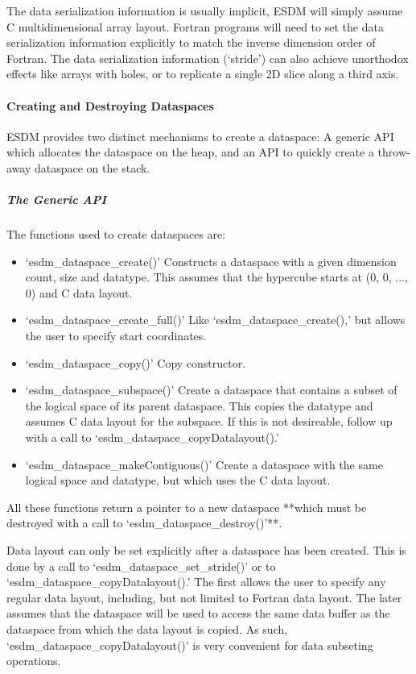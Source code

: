The data serialization information is usually implicit, ESDM will simply
assume C multidimensional array layout. Fortran programs will need to
set the data serialization information explicitly to match the inverse
dimension order of Fortran. The data serialization information
(`stride') can also achieve unorthodox effects like arrays with holes,
or to replicate a single 2D slice along a third axis.

\paragraph{Creating and Destroying Dataspaces}

ESDM provides two distinct mechanisms to create a dataspace: A generic
API which allocates the dataspace on the heap, and an API to quickly
create a throw-away dataspace on the stack.

\subparagraph{The Generic API}

The functions used to create dataspaces are:

\begin{itemize}
  \item `esdm\_dataspace\_create()'
    Constructs a dataspace with a given dimension count, size and
    datatype. This assumes that the hypercube starts at (0, 0, ..., 0) and
    C data layout.
  \item `esdm\_dataspace\_create\_full()'
    Like `esdm\_dataspace\_create(),' but allows the user to specify start
    coordinates.
  \item `esdm\_dataspace\_copy()'
    Copy constructor.
  \item `esdm\_dataspace\_subspace()'
    Create a dataspace that contains a subset of the logical space of its
    parent dataspace. This copies the datatype and assumes C data layout
    for the subspace. If this is not desireable, follow up with a call to
    `esdm\_dataspace\_copyDatalayout().'
  \item `esdm\_dataspace\_makeContiguous()'
    Create a dataspace with the same logical space and datatype, but which
    uses the C data layout.
\end{itemize}

All these functions return a pointer to a new dataspace **which must be
destroyed with a call to `esdm\_dataspace\_destroy()'**.

Data layout can only be set explicitly after a dataspace has been
created. This is done by a call to `esdm\_dataspace\_set\_stride()' or
to `esdm\_dataspace\_copyDatalayout().' The first allows the user to
specify any regular data layout, including, but not limited to Fortran
data layout. The later assumes that the dataspace will be used to access
the same data buffer as the dataspace from which the data layout is
copied. As such, `esdm\_dataspace\_copyDatalayout()' is very convenient
for data subseting operations.

